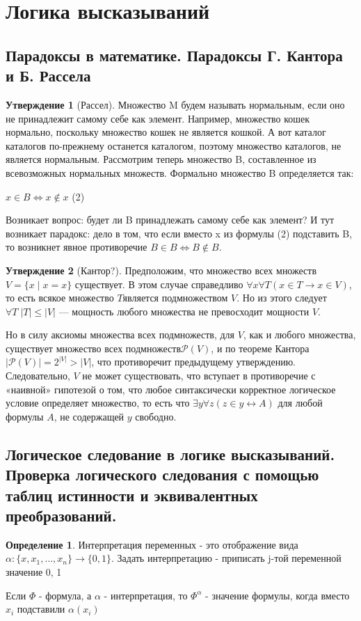 \documentclass[a4paper]{article}
\theoremstyle{definition}
\newtheorem*{definition}{Определение}
\newtheorem*{statement}{Утверждение}
\theoremstyle{remark}
\begin{document}
    \section{Логика высказываний}
    \subsection{Парадоксы в математике. Парадоксы Г. Кантора и  Б. Рассела}
    \begin{statement}[Рассел]
        Множество M будем называть нормальным, если оно не
        принадлежит самому себе как элемент. Например, множество кошек нормально, поскольку множество кошек не является кошкой. А вот каталог каталогов
        по-прежнему останется каталогом, поэтому множество каталогов, не является
        нормальным. Рассмотрим теперь множество B, составленное из всевозможных
        нормальных множеств. Формально множество B определяется так:

        $x \in  B \Leftrightarrow  x \notin  x $ (2)

        Возникает вопрос: будет ли B принадлежать самому себе как элемент? И тут
        возникает парадокс: дело в том, что если вместо x из формулы (2) подставить
        B, то возникнет явное противоречие
        $B \in  B \Leftrightarrow B \notin  B.$
    \end{statement}
    \begin{statement}[Кантор?]
        Предположим, что множество всех множеств ${ V=\{x\mid x=x\}}$ существует.
        В этом случае справедливо ${ \forall x\forall T(x\in T\rightarrow x\in V)}$, то есть всякое множество
        ${ T} $является подмножеством ${ V}$. Но из этого следует
        ${ \forall T\;|T|\leqslant |V|}$ — мощность
        любого множества не превосходит мощности ${ V}$.

        Но в силу аксиомы множества всех подмножеств, для ${ V}$, как и любого множества,
        существует множество всех подмножеств$ { {\mathcal {P}}(V)}$, и по
        теореме Кантора ${ |{\mathcal {P}}(V)|=2^{|V|}>|V|}$,
        что противоречит предыдущему утверждению. Следовательно, ${ V}$ не может существовать,
        что вступает в противоречие с «наивной» гипотезой о том, что любое синтаксически корректное логическое условие
        определяет множество, то есть что ${ \exists y\forall z(z\in y\leftrightarrow A)}$ для любой формулы ${ A}$,
        не содержащей ${ y}$ свободно.
    \end{statement}
    \subsection{Логическое следование в логике высказываний. Проверка логического следования с помощью таблиц истинности и эквивалентных преобразований.}
    \begin{definition}
    Интерпретация переменных - это отображение вида $\alpha : \{ x, x_1, \dots, x_n \} \to \{ 0, 1\} $.
    Задать интерпретацию - приписать j-той переменной значение 0, 1
    \end{definition}
    Если $\Phi$ - формула, а $\alpha$ - интерпретация, то $\Phi^\alpha$ - значение формулы, когда вместо $x_i$ подставили $\alpha (x_i)$
    
\end{document}
